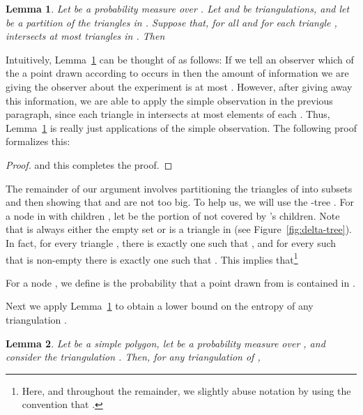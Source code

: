 \documentclass[lotsofwhite]{patmorin}
\newcommand{\figref}[1]{\mbox{Figure~\ref{fig:#1}}}
\newtheorem{lem}{Lemma}{\bfseries}{\itshape}
\newcommand{\lemlabel}[1]{\label{lem:#1}}
\newcommand{\lemref}[1]{Lemma~\ref{lem:#1}}
\begin{document}
\begin{lem}\lemlabel{pieces}
Let  be a probability measure over .  Let  and
 be triangulations, and let 
be a partition of the triangles in .  Suppose that, for all
 and for each triangle , 
intersects at most  triangles in .  Then

\end{lem}

Intuitively, \lemref{pieces} can be thought of as follows:  If we tell
an observer which of the  a point  drawn according to 
occurs in then the amount of information we are giving the observer
about the experiment is at most
.  However, after giving away
this information, we are able to apply the simple observation in the
previous paragraph, since each triangle in  intersects at
most  elements of each .  Thus, \lemref{pieces} is
really just  applications of the simple observation.  The following
proof formalizes this:

\begin{proof}

and this completes the proof.
\end{proof}

The remainder of our argument involves partitioning the triangles of
 into subsets  and then showing that
 and  are not too big.  To help us, we will use the -tree .
For a node  in  with children , let  be the portion of  not covered by
's children.  Note that  is always either the empty set or is
a triangle in  (see \figref{delta-tree}).  In fact, for every
triangle , there is exactly one  such that
, and for every  such that  is non-empty
there is exactly one  such that .  This implies
that\footnote{Here, and throughout the remainder, we slightly abuse
notation by using the convention that .}

For a node , we define  is the
probability that a point drawn from  is contained in .

Next we apply \lemref{pieces} to obtain a lower bound on the
entropy of any triangulation . 

\begin{lem}\lemlabel{min-H-triangulation}\lemlabel{Z}
Let  be a simple polygon, let  be a probability measure over
, and consider the triangulation .
Then, for any triangulation  of ,

\end{lem}
\end{document}
